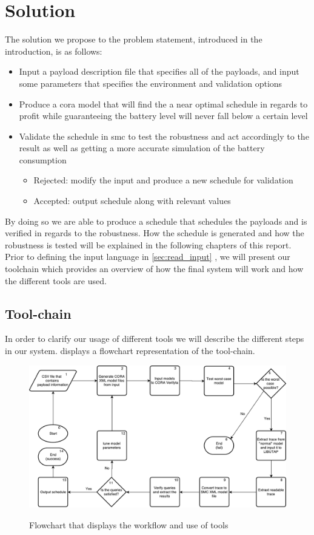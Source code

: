 \section{Solution} \label{sec:solution}
The solution we propose to the problem statement, introduced in the introduction, is as follows:
\begin{itemize}
	\item	Input a payload description file that specifies all of the payloads, and input some parameters that specifies the environment and validation options
	\item	Produce a \gls{cora} model that will find the a near optimal schedule in regards to profit while guaranteeing the battery level will never fall below a certain level
	\item	Validate the schedule in \gls{smc} to test the robustness and act accordingly to the result as well as getting a more accurate simulation of the battery consumption
	\begin{itemize}
		\item	Rejected: modify the input and produce a new schedule for validation
		\item	Accepted: output schedule along with relevant values
	\end{itemize}
\end{itemize}

By doing so we are able to produce a schedule that schedules the payloads and is verified in regards to the robustness.
How the schedule is generated and how the robustness is tested will be explained in the following chapters of this report.
Prior to defining the input language in \cref{sec:read_input} , we will present our toolchain which provides an overview of how the final system will work and how the different tools are used.

\subsection{Tool-chain} \label{subsec:tool_chainv}
In order to clarify our usage of different tools we will describe the different steps in our system. 
 displays a flowchart representation of the tool-chain.

\begin{figure}[h]
	\includegraphics[width=\textwidth]{graphics/tool_chain.pdf}
	\label{fig:tool1}
	\caption{Flowchart that displays the workflow and use of tools}
\end{figure}

